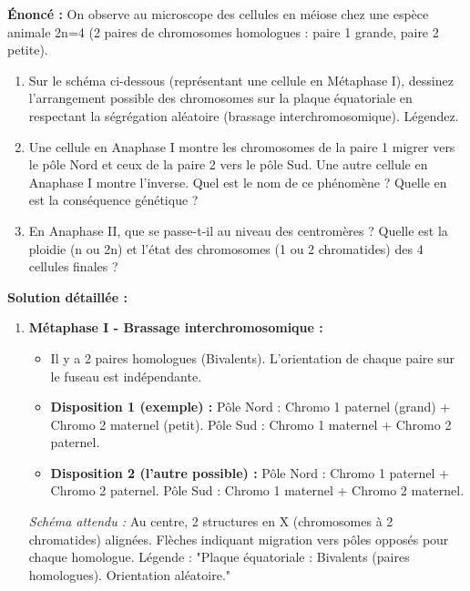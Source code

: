 \documentclass[11pt]{article}
\begin{document}
\begin{exoresolu}
    \textbf{Énoncé :} On observe au microscope des cellules en méiose chez une espèce animale 2n=4 (2 paires de chromosomes homologues : paire 1 grande, paire 2 petite).
    \begin{enumerate}
        \item Sur le schéma ci-dessous (représentant une cellule en Métaphase I), dessinez l'arrangement possible des chromosomes sur la plaque équatoriale en respectant la ségrégation aléatoire (brassage interchromosomique). Légendez.
        \item Une cellule en Anaphase I montre les chromosomes de la paire 1 migrer vers le pôle Nord et ceux de la paire 2 vers le pôle Sud. Une autre cellule en Anaphase I montre l'inverse. Quel est le nom de ce phénomène ? Quelle en est la conséquence génétique ?
        \item En Anaphase II, que se passe-t-il au niveau des centromères ? Quelle est la ploidie (n ou 2n) et l'état des chromosomes (1 ou 2 chromatides) des 4 cellules finales ?
    \end{enumerate}
    \tcblower
    \textbf{Solution détaillée :}
    \begin{enumerate}
        \item \textbf{Métaphase I - Brassage interchromosomique :}
            \begin{itemize}
                \item Il y a 2 paires homologues (Bivalents). L'orientation de chaque paire sur le fuseau est indépendante.
                \item \textbf{Disposition 1 (exemple) :} Pôle Nord : Chromo 1 paternel (grand) + Chromo 2 maternel (petit). Pôle Sud : Chromo 1 maternel + Chromo 2 paternel.
                \item \textbf{Disposition 2 (l'autre possible) :} Pôle Nord : Chromo 1 paternel + Chromo 2 paternel. Pôle Sud : Chromo 1 maternel + Chromo 2 maternel.
            \end{itemize}
            \textit{Schéma attendu :} Au centre, 2 structures en X (chromosomes à 2 chromatides) alignées. Flèches indiquant migration vers pôles opposés pour chaque homologue. Légende : "Plaque équatoriale : Bivalents (paires homologues). Orientation aléatoire."
            \begin{popfigure}
                \begin{tikzpicture}[scale=0.8, every node/.style={font=\small}]

\end{tikzpicture}
\end{popfigure}
\end{enumerate}
\end{exoresolu}
\end{document}
